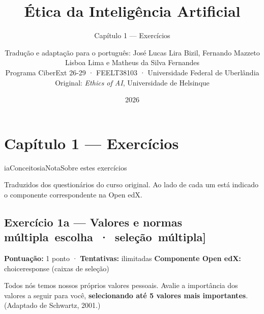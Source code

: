 \documentclass[
  11pt,
]{article}
\title{Ética da Inteligência Artificial}
\subtitle{Capítulo 1 --- Exercícios}
\author{Tradução e adaptação para o português: José Lucas Lira Bizil,
Fernando Mazzeto Lisboa Lima e Matheus da Silva Fernandes\\
Programa CiberExt 26-29 · FEELT38103 · Universidade Federal de
Uberlândia\\
Original: \emph{Ethics of AI}, Universidade de Helsinque}
\date{2026}
\renewcommand{\texttt}[1]{{\color{iaAmeixa}\small\ttfamily #1}}
\newenvironment{nota}[1][Nota]{\begin{iabox}{iaConceitos}{iaNota}{#1}}{\end{iabox}}
\begin{document}
\maketitle

{
\hypersetup{linkcolor=iaConceitos}
\setcounter{tocdepth}{2}
\tableofcontents
}
\hypertarget{capuxedtulo-1-exercuxedcios}{%
\section{Capítulo 1 --- Exercícios}\label{capuxedtulo-1-exercuxedcios}}

\begin{nota}[Sobre estes exercícios]

Traduzidos dos questionários do curso original. Ao lado de cada um está
indicado o componente correspondente na Open edX.

\end{nota}

\hypertarget{exercuxedcio-1a-valores-e-normas-muxfaltipla-escolha-seleuxe7uxe3o-muxfaltipla}{%
\subsection{\texorpdfstring{Exercício 1a --- Valores e normas
\texttt{{[}múltipla\ escolha\ ·\ seleção\ múltipla{]}}}{Exercício 1a --- Valores e normas {[}múltipla escolha · seleção múltipla{]}}}\label{exercuxedcio-1a-valores-e-normas-muxfaltipla-escolha-seleuxe7uxe3o-muxfaltipla}}

\textbf{Pontuação:} 1 ponto · \textbf{Tentativas:} ilimitadas
\textbf{Componente Open edX:} \texttt{choiceresponse} (caixas de
seleção)

Todos nós temos nossos próprios valores pessoais. Avalie a importância
dos valores a seguir para você, \textbf{selecionando até 5 valores mais
importantes}. (Adaptado de Schwartz, 2001.)
\end{document}
